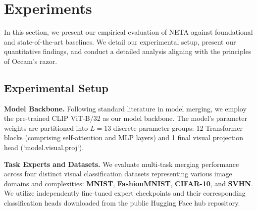 \section{Experiments}
\label{sec:experiments}

In this section, we present our empirical evaluation of NETA against foundational and state-of-the-art baselines. We detail our experimental setup, present our quantitative findings, and conduct a detailed analysis aligning with the principles of Occam's razor.

\subsection{Experimental Setup}
\textbf{Model Backbone.} Following standard literature in model merging, we employ the pre-trained CLIP ViT-B/32 \cite{radford2021clip} as our model backbone. The model's parameter weights are partitioned into $L = 13$ discrete parameter groups: 12 Transformer blocks (comprising self-attention and MLP layers) and 1 final visual projection head (`model.visual.proj`). 

\textbf{Task Experts and Datasets.} We evaluate multi-task merging performance across four distinct visual classification datasets representing various image domains and complexities: \textbf{MNIST}, \textbf{FashionMNIST}, \textbf{CIFAR-10}, and \textbf{SVHN}. We utilize independently fine-tuned expert checkpoints and their corresponding classification heads downloaded from the public Hugging Face hub repository.

